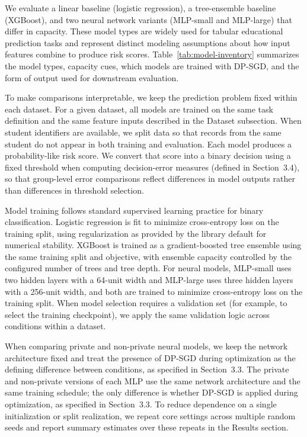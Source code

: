 \documentclass{edm_article}
\begin{document}
We evaluate a linear baseline (logistic regression), a tree-ensemble baseline (XGBoost), and two neural network variants (MLP-small and MLP-large) that differ in capacity. These model types are widely used for tabular educational prediction tasks and represent distinct modeling assumptions about how input features combine to produce risk scores. Table~\ref{tab:model-inventory} summarizes the model types, capacity cues, which models are trained with DP-SGD, and the form of output used for downstream evaluation.

To make comparisons interpretable, we keep the prediction problem fixed within each dataset. For a given dataset, all models are trained on the same task definition and the same feature inputs described in the Dataset subsection. When student identifiers are available, we split data so that records from the same student do not appear in both training and evaluation. Each model produces a probability-like risk score. We convert that score into a binary decision using a fixed threshold when computing decision-error measures (defined in Section~3.4), so that group-level error comparisons reflect differences in model outputs rather than differences in threshold selection.

Model training follows standard supervised learning practice for binary classification. Logistic regression is fit to minimize cross-entropy loss on the training split, using regularization as provided by the library default for numerical stability. XGBoost is trained as a gradient-boosted tree ensemble using the same training split and objective, with ensemble capacity controlled by the configured number of trees and tree depth. For neural models, MLP-small uses two hidden layers with a 64-unit width and MLP-large uses three hidden layers with a 256-unit width, and both are trained to minimize cross-entropy loss on the training split. When model selection requires a validation set (for example, to select the training checkpoint), we apply the same validation logic across conditions within a dataset.

When comparing private and non-private neural models, we keep the network architecture fixed and treat the presence of DP-SGD during optimization as the defining difference between conditions, as specified in Section~3.3. The private and non-private versions of each MLP use the same network architecture and the same training schedule; the only difference is whether DP-SGD is applied during optimization, as specified in Section~3.3. To reduce dependence on a single initialization or split realization, we repeat core settings across multiple random seeds and report summary estimates over these repeats in the Results section.
\end{document}
